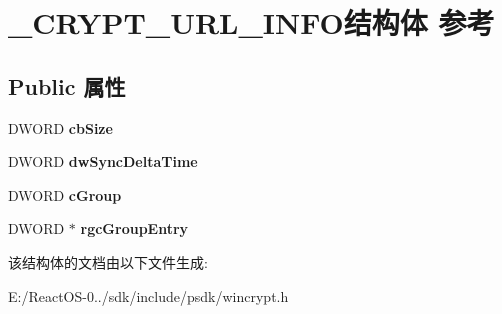 \hypertarget{struct___c_r_y_p_t___u_r_l___i_n_f_o}{}\section{\+\_\+\+C\+R\+Y\+P\+T\+\_\+\+U\+R\+L\+\_\+\+I\+N\+F\+O结构体 参考}
\label{struct___c_r_y_p_t___u_r_l___i_n_f_o}
\subsection*{Public 属性}
\begin{DoxyCompactItemize}
\item 
\mbox{\label{struct___c_r_y_p_t___u_r_l___i_n_f_o_abc6028893af44d92686a03243269aba0}} 
D\+W\+O\+RD {\bfseries cb\+Size}
\item 
\mbox{\label{struct___c_r_y_p_t___u_r_l___i_n_f_o_a631331f50d6d503aa32c65fb49cdc951}} 
D\+W\+O\+RD {\bfseries dw\+Sync\+Delta\+Time}
\item 
\mbox{\label{struct___c_r_y_p_t___u_r_l___i_n_f_o_ac66fa199aeb5579fab5e9cc1ce0614de}} 
D\+W\+O\+RD {\bfseries c\+Group}
\item 
\mbox{\label{struct___c_r_y_p_t___u_r_l___i_n_f_o_a2f511e8b246f5160688de061f515e165}} 
D\+W\+O\+RD $\ast$ {\bfseries rgc\+Group\+Entry}
\end{DoxyCompactItemize}


该结构体的文档由以下文件生成\+:\begin{DoxyCompactItemize}
\item 
E\+:/\+React\+O\+S-\/0../sdk/include/psdk/wincrypt.\+h\end{DoxyCompactItemize}
